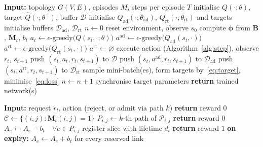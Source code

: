 \documentclass[10pt,journal,comsoc]{IEEEtran}
\begin{document}
\begin{algorithm}[t]
\caption{Training loop for both agent architectures}
\label{alg:training}
\scriptsize
\begin{algorithmic}[1]
\State \textbf{Input:} topology $G(V,E)$, episodes $M$, steps per episode $T$
    \State initialise $Q(\cdot;\theta)$, target $\hat{Q}(\cdot;\theta^-)$, buffer $\mathcal{D}$
\Else
    \State initialise $Q_{\text{ad}}(\cdot;\theta_{\text{ad}})$, $Q_{\text{rt}}(\cdot;\theta_{\text{rt}})$ and targets
    \State initialise buffers $\mathcal{D}_{\text{ad}}$, $\mathcal{D}_{\text{rt}}$
\EndIf
\State $n \gets 0$ 
  \State reset environment, observe $s_0$
    \State compute $\boldsymbol{\phi}$ from $\mathbf{B}$, $\mathbf{M}_t$, $b_t$ 
        \State $a_t \gets \epsilon\text{-greedy}\bigl(Q(s_t,\cdot;\theta)\bigr)$
    \Else
        \State $a^{\text{ad}} \gets \epsilon\text{-greedy}\bigl(Q_{\text{ad}}(s_t,\cdot)\bigr)$
            \State $a^{\text{rt}} \gets \epsilon\text{-greedy}\bigl(Q_{\text{rt}}(s_t,\cdot)\bigr)$
        \Else
            \State $a^{\text{rt}} \gets \varnothing$
        \EndIf
    \EndIf
    \State execute action (Algorithm~\ref{alg:step}), observe $r_t$, $s_{t+1}$
        \State push $(s_t,a_t,r_t,s_{t+1})$ to $\mathcal{D}$
    \Else
        \State push $(s_t,a^{\text{ad}},r_t,s_{t+1})$ to $\mathcal{D}_{\text{ad}}$
         push $(s_t,a^{\text{rt}},r_t,s_{t+1})$ to $\mathcal{D}_{\text{rt}}$
        \EndIf
    \EndIf
    \State sample mini-batch(es), form targets by~\eqref{eq:target}, minimise~\eqref{eq:loss}
    \State $n \gets n+1$
     synchronise target parameters \EndIf
  \EndFor
\EndFor
\State \textbf{return} trained network(s)
\end{algorithmic}
\end{algorithm}

\begin{algorithm}[t]
\caption{Environment step: admission and reservation}
\label{alg:step}
\scriptsize
\begin{algorithmic}[1]
\State \textbf{Input:} request $r_t$, action (reject, or admit via path $k$)
   \State \textbf{return} reward $0$
\EndIf
\State $\mathcal{C} \gets \{(i,j) : \mathbf{M}_t(i,j)=1\}$
   \State $P_{i,j} \gets k$-th path of $\mathcal{P}_{i,j}$
       \State \textbf{return} reward $0$ 
   \EndIf
\EndFor
{} 
   \State $A_e \gets A_e - b_t \quad \forall e \in P_{i,j}$
\EndFor
\State register slice with lifetime $d_t$
\State \textbf{return} reward $1$
\State \textbf{on expiry:} $A_e \gets A_e + b_t$ for every reserved link
\end{algorithmic}
\end{algorithm}
\end{document}
